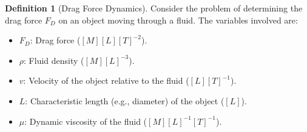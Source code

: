\documentclass{article}
\theoremstyle{definition}
\newtheorem{definition}{Definition}[section]
\theoremstyle{remark}
\begin{document}
	\begin{definition}[Drag Force Dynamics]
		Consider the problem of determining the drag force $F_D$ on an object moving through a fluid. The variables involved are:
		\begin{itemize}
			\item $F_D$: Drag force ($[M][L][T]^{-2}$).
			\item $\rho$: Fluid density ($[M][L]^{-3}$).
			\item $v$: Velocity of the object relative to the fluid ($[L][T]^{-1}$).
			\item $L$: Characteristic length (e.g., diameter) of the object ($[L]$).
			\item $\mu$: Dynamic viscosity of the fluid ($[M][L]^{-1}[T]^{-1}$).
		\end{itemize}
	\end{definition}
	
\end{document}
